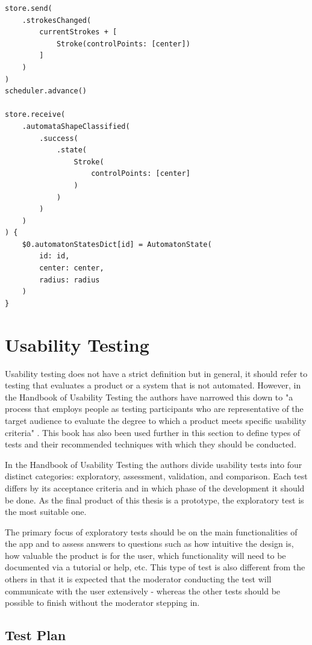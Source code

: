 \begin{lstlisting}[caption={Testing creation of state}, label=test-state]
store.send(
    .strokesChanged(
        currentStrokes + [
            Stroke(controlPoints: [center])
        ]
    )
)
scheduler.advance()

store.receive(
    .automataShapeClassified(
        .success(
            .state(
                Stroke(
                    controlPoints: [center]
                )
            )
        )
    )
) {
    $0.automatonStatesDict[id] = AutomatonState(
        id: id,
        center: center,
        radius: radius
    )
}
\end{lstlisting}

\section{Usability Testing}

Usability testing does not have a strict definition but in general, it should refer to testing that evaluates a product or a system that is not automated. However, in the Handbook of Usability Testing the authors have narrowed this down to "a process that employs people as testing participants who are representative of the target audience to evaluate the degree to which a product meets specific usability criteria" \cite{handbook-usability-testing}. This book has also been used further in this section to define types of tests and their recommended techniques with which they should be conducted.

In the Handbook of Usability Testing the authors divide usability tests into four distinct categories: exploratory, assessment, validation, and comparison. Each test differs by its acceptance criteria and in which phase of the development it should be done. As the final product of this thesis is a prototype, the exploratory test is the most suitable one.

The primary focus of exploratory tests should be on the main functionalities of the app and to assess answers to questions such as how intuitive the design is, how valuable the product is for the user, which functionality will need to be documented via a tutorial or help, etc. This type of test is also different from the others in that it is expected that the moderator conducting the test will communicate with the user extensively - whereas the other tests should be possible to finish without the moderator stepping in.

\subsection{Test Plan}

